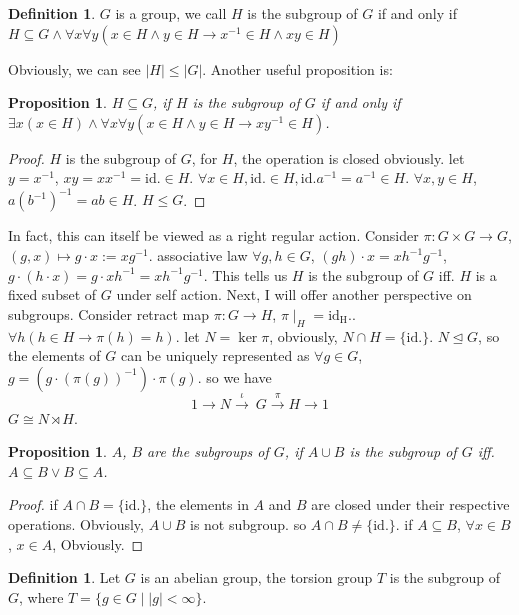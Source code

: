 \documentclass[10pt,a4paper]{article}
\newtheorem{proposition}[theorem]{Proposition}
\theoremstyle{definition}
\newtheorem{definition}[theorem]{Definition}
\begin{document}
\begin{definition}
    $G$ is a group, we 
    call $H$ is the subgroup of $G$ if and only if $H\subseteq G\land\forall x\forall y(x\in H\land y\in H\rightarrow x^{-1}\in H\land xy\in H)$
\end{definition}
Obviously, we can see $|H|\le|G|$. Another useful proposition is:
\begin{proposition}
    $H\subseteq G$, if $H$ is the subgroup of $G$ if and only if $\exists x(x\in H)\land\forall x\forall y(x\in H\land y\in H\rightarrow xy^{-1}\in H)$.
\end{proposition}
\begin{proof}
    $H$ is the subgroup of $G$, for $H$, the operation is closed obviously.
    let $y=x^{-1}$, $xy=xx^{-1}=\mathrm{id.}\in H$. $\forall x\in H,\mathrm{id.}\in H,\mathrm{id.}a^{-1}=a^{-1}\in H$.
    $\forall x,y\in H$, $a(b^{-1})^{-1}=ab\in H$. $H\le G$.
\end{proof}
In fact, this can itself be viewed as a right regular action. Consider $\pi:G\times G\to G$, $(g,x)\mapsto g\cdot x:=xg^{-1}$.
associative law $\forall g,h\in G$, $(gh)\cdot x=xh^{-1}g^{-1}$, $g\cdot(h\cdot x)=g\cdot xh^{-1}=xh^{-1}g^{-1}$. 
This tells us $H$ is the subgroup of $G$ iff. $H$ is a fixed subset of $G$ under self action. Next, I will offer another perspective on subgroups.
Consider retract map $\pi:G\to H$, $\pi\mid_H=\mathrm{id_H.}$. $\forall h(h\in H\rightarrow\pi(h)=h)$. let $N=\ker\pi$, obviously, $N\cap H=\{\mathrm{id.}\}$.
$N\trianglelefteq G$, so the elements of $G$ can be uniquely represented as $\forall g\in G$, $g=(g\cdot(\pi(g))^{-1})\cdot\pi(g)$.
so we have \[1\longrightarrow N\overset{\iota}\longrightarrow\ G\overset{\pi}\longrightarrow H\longrightarrow1\]
$G\cong N\rtimes H$.
\begin{proposition}
    $A$, $B$ are the subgroups of $G$, if $A\cup B$ is the subgroup of $G$ iff. $A\subseteq B\lor B\subseteq A$.
\end{proposition}
\begin{proof}
    if $A\cap B=\{\mathrm{id.}\}$, the elements in $A$ and $B$ are closed under their respective operations. Obviously, $A\cup B$ is not subgroup.
    so $A\cap B\ne\{\mathrm{id.}\}$. if $A\subseteq B$, $\forall x\in B$, $x\in A$, Obviously.
\end{proof}
\begin{definition}
    Let $G$ is an abelian group, the torsion group $T$ is the subgroup of $G$, where $T=\{g\in G\mid|g|<\infty\}$.
\end{definition}
\end{document}
